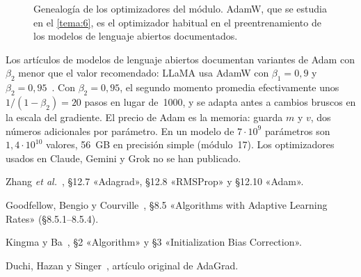 \begin{figure}[t]
\centering
{}
\caption{Genealogía de los optimizadores del módulo. AdamW, que se estudia en el \cref{tema:6}, es el optimizador habitual en el preentrenamiento de los modelos de lenguaje abiertos documentados.}
\label{fig:genealogia}
\end{figure}

\begin{observacion}
Los artículos de modelos de lenguaje abiertos documentan variantes de Adam con $\beta_2$ menor que el valor recomendado: LLaMA usa AdamW con $\beta_1=0{,}9$ y $\beta_2=0{,}95$~\cite[§2.3]{llama}. Con $\beta_2=0{,}95$, el segundo momento promedia efectivamente unos $1/(1-\beta_2)=20$ pasos en lugar de~1000, y se adapta antes a cambios bruscos en la escala del gradiente. El precio de Adam es la memoria: guarda $m$ y $v$, dos números adicionales por parámetro. En un modelo de $7\cdot 10^{9}$ parámetros son $1{,}4\cdot 10^{10}$ valores, 56~GB en precisión simple (módulo~17). Los optimizadores usados en Claude, Gemini y Grok no se han publicado.
\end{observacion}

\begin{lecturas}
\item Zhang \emph{et al.}~\cite{d2l}, §12.7 «Adagrad», §12.8 «RMSProp» y §12.10 «Adam».
\item Goodfellow, Bengio y Courville~\cite{gbc}, §8.5 «Algorithms with Adaptive Learning Rates» (§8.5.1--8.5.4).
\item Kingma y Ba~\cite{adam}, §2 «Algorithm» y §3 «Initialization Bias Correction».
\item Duchi, Hazan y Singer~\cite{adagrad}, artículo original de AdaGrad.
\end{lecturas}

